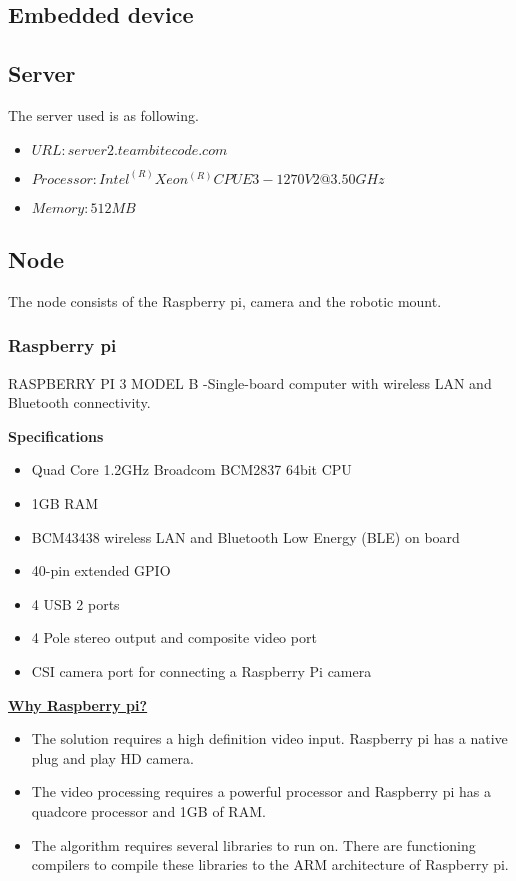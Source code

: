 \documentclass{report}
\begin{document}
\subsection{Embedded device}

\subsection{Server}
The server used is as following.
\begin{itemize}
    \item $URL: server2.teambitecode.com$
    \item $Processor:Intel^{(R)} Xeon^{(R)} CPU E3-1270 V2 @ 3.50GHz$
    \item $Memory: 512MB$
\end{itemize}

\subsection{Node}

The node consists of the Raspberry pi, camera and the robotic mount.\\

\subsubsection{Raspberry pi}

RASPBERRY PI 3 MODEL B -Single-board computer with wireless LAN and Bluetooth connectivity.

\textbf{Specifications}
\begin{itemize}
    \item Quad Core 1.2GHz Broadcom BCM2837 64bit CPU
    \item 1GB RAM
    \item BCM43438 wireless LAN and Bluetooth Low Energy (BLE) on board
    \item 40-pin extended GPIO
    \item 4 USB 2 ports
    \item 4 Pole stereo output and composite video port
    \item CSI camera port for connecting a Raspberry Pi camera
\end{itemize}

\textbf{\underline{Why Raspberry pi?}}
\begin{itemize}
    \item The solution requires a high definition video input. Raspberry pi has a native plug and play HD camera.
    \item The video processing requires a powerful processor and Raspberry pi has a quadcore processor and 1GB of RAM.
    \item The algorithm requires several libraries to run on. There are functioning compilers to compile these libraries to the ARM architecture of Raspberry pi.
\end{itemize}
\end{document}
